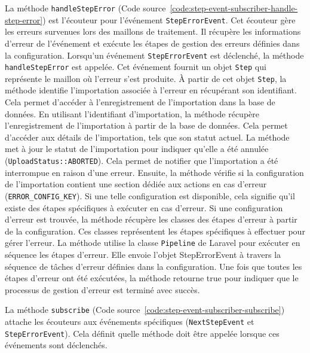 La méthode \Verb|handleStepError| (Code source~\ref{code:step-event-subscriber-handle-step-error}) est l'écouteur pour l'événement \Verb|StepErrorEvent|. Cet écouteur gère les erreurs survenues lors des maillons de traitement. Il récupère les informations d'erreur de l'événement et exécute les étapes de gestion des erreurs définies dans la configuration. Lorsqu'un événement \Verb|StepErrorEvent| est déclenché, la méthode \Verb|handleStepError| est appelée. Cet événement fournit un objet \Verb|Step| qui représente le maillon où l'erreur s'est produite. À partir de cet objet \Verb|Step|, la méthode identifie l'importation associée à l'erreur en récupérant son identifiant. Cela permet d'accéder à l'enregistrement de l'importation dans la base de données. En utilisant l'identifiant d'importation, la méthode récupère l'enregistrement de l'importation à partir de la base de données. Cela permet d'accéder aux détails de l'importation, tels que son statut actuel. La méthode met à jour le statut de l'importation pour indiquer qu'elle a été annulée (\Verb|UploadStatus::ABORTED|). Cela permet de notifier que l'importation a été interrompue en raison d'une erreur. Ensuite, la méthode vérifie si la configuration de l'importation contient une section dédiée aux actions en cas d'erreur (\Verb|ERROR_CONFIG_KEY|). Si une telle configuration est disponible, cela signifie qu'il existe des étapes spécifiques à exécuter en cas d'erreur. Si une configuration d'erreur est trouvée, la méthode récupère les classes des étapes d'erreur à partir de la configuration. Ces classes représentent les étapes spécifiques à effectuer pour gérer l'erreur. La méthode utilise la classe \Verb|Pipeline| de Laravel pour exécuter en séquence les étapes d'erreur. Elle envoie l'objet StepErrorEvent à travers la séquence de tâches d'erreur définies dans la configuration. Une fois que toutes les étapes d'erreur ont été exécutées, la méthode retourne true pour indiquer que le processus de gestion d'erreur est terminé avec succès.


La méthode \Verb|subscribe| (Code source~\ref{code:step-event-subscriber-subscribe}) attache les écouteurs aux événements spécifiques (\Verb|NextStepEvent| et \Verb|StepErrorEvent|). Cela définit quelle méthode doit être appelée lorsque ces événements sont déclenchés.

